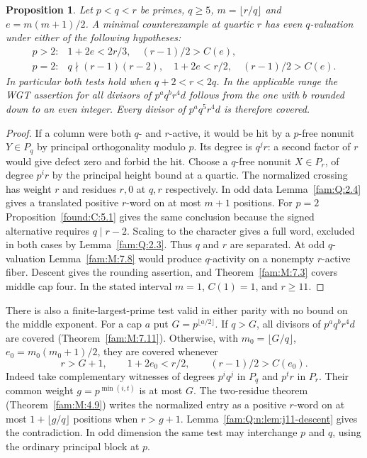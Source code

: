\documentclass[11pt,a4paper]{article}
\numberwithin{equation}{section}
\newtheorem{proposition}[theorem]{Proposition}
\theoremstyle{remark}
\begin{document}
\begin{proposition}\label{fam:Q:4.2}\label{fam:Q:n:quart:parity}
Let $p<q<r$ be primes, $q\ge5$, $m=\lfloor r/q\rfloor$ and
$e=m(m+1)/2$. A minimal counterexample at quartic $r$ has even
$q$-valuation under either of the following hypotheses:
\[
\begin{array}{ll}
 p>2: &1+2e<2r/3,\quad (r-1)/2>C(e),\\
 p=2: &q\nmid(r-1)(r-2),\quad 1+2e<r/2,\quad (r-1)/2>C(e).
\end{array}
\]
In particular both tests hold when $q+2<r<2q$. In the applicable
range the WGT assertion for all divisors of $p^a q^b r^4d$
follows from the one with $b$ rounded down to an even integer.
Every divisor of $p^a q^5 r^4d$ is therefore covered.
\end{proposition}
\begin{proof}
If a column were both $q$- and $r$-active, it would be hit by a
$p$-free nonunit $Y\in P_q$ by principal orthogonality modulo $p$.
Its degree is $q^j r$: a second factor of $r$ would give defect
zero and forbid the hit. Choose a $q$-free nonunit $X\in P_r$,
of degree $p^i r$ by the principal height bound at a quartic.
The normalized crossing has weight $r$ and residues $r,0$ at
$q,r$ respectively. In odd data Lemma~\ref{fam:Q:2.4} gives a
translated positive $r$-word on at most $m+1$ positions. For
$p=2$ Proposition~\ref{found:C:5.1} gives the same conclusion
because the signed alternative requires $q\mid r-2$. Scaling to the
character gives a full word, excluded in both cases by
Lemma~\ref{fam:Q:2.3}. Thus $q$ and $r$ are separated.
At odd $q$-valuation Lemma~\ref{fam:M:7.8} would produce
$q$-activity on a nonempty $r$-active fiber. Descent gives the
rounding assertion, and Theorem~\ref{fam:M:7.3} covers middle
cap four. In the stated interval $m=1$, $C(1)=1$, and $r\ge11$.
\end{proof}

There is also a finite-largest-prime test valid in either parity
with no bound on the middle exponent. For a cap $a$ put
$G=p^{\lfloor a/2\rfloor}$. If $q>G$, all divisors of
$p^a q^b r^4d$ are covered (Theorem~\ref{fam:M:7.11}). Otherwise,
with $m_0=\lfloor G/q\rfloor$, $e_0=m_0(m_0+1)/2$, they are
covered whenever
\[
 r>G+1,\qquad 1+2e_0<r/2,\qquad (r-1)/2>C(e_0).
\]
Indeed take complementary witnesses of degrees $p^i q^j$ in
$P_q$ and $p^t r$ in $P_r$. Their common weight
$g=p^{\min(i,t)}$ is at most $G$. The two-residue theorem
(Theorem~\ref{fam:M:4.9}) writes the normalized entry as a positive
$r$-word on at most $1+\lfloor g/q\rfloor$ positions when $r>g+1$.
Lemma~\ref{fam:Q:n:lem:j11-descent} gives the contradiction. In odd dimension
the same test may interchange $p$ and $q$, using the ordinary
principal block at $p$.
\end{document}
